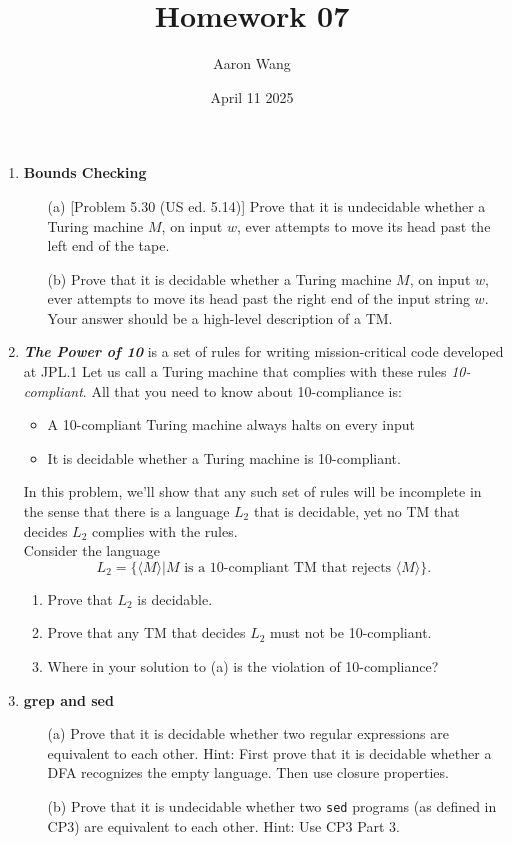 \documentclass{article}
\title{Homework 07}
\author{Aaron Wang}
\date{April 11 2025}
\newcommand{\str}{\texttt}
\newcommand{\newp}{\\[2mm]}
\begin{document}
\maketitle
\begin{enumerate}
    \item \textbf{Bounds Checking}
    \begin{enumerate}
        \item [(a)] [Problem 5.30 (US ed. 5.14)] Prove that it is undecidable whether a Turing machine $M$, on input $w$, ever attempts to move its head past the left end of the tape.\newp
        
        \item [(b)]Prove that it is decidable whether a Turing machine $M$, on input $w$, ever attempts to move its head past the right end of the input string $w$. Your answer should be a high-level description of a TM.\newp
        
    \end{enumerate}
\newpage
    \item \textbf{\emph{The Power of 10}} is a set of rules for writing mission-critical code developed
at JPL.1 Let us call a Turing machine that complies with these rules \emph{10-compliant}. All that you need to know about 10-compliance is:
    \begin{itemize}
        \item A 10-compliant Turing machine always halts on every input
        \item It is decidable whether a Turing machine is 10-compliant.
    \end{itemize}
    In this problem, we’ll show that any such set of rules will be incomplete in the sense that there is a language $L_2$ that is decidable, yet no TM that decides $L_2$ complies with the rules.\newp
    Consider the language
    \[
        L_2 = \{\langle M \rangle | M\text{ is a 10-compliant TM that rejects } \langle M \rangle \}.
    \]
    \begin{enumerate}
        \item Prove that $L_2$ is decidable.\newp
        
        \item Prove that any TM that decides $L_2$ must not be 10-compliant.\newp
        
        \item Where in your solution to (a) is the violation of 10-compliance?\newp
        
    \end{enumerate}
\newpage
    \item \textbf{grep and sed}
    \begin{enumerate}
        \item [(a)] Prove that it is decidable whether two regular expressions are equivalent to each other. Hint: First prove that it is decidable whether a DFA recognizes the empty language. Then use closure properties.\newp
        
        \item [(b)] Prove that it is undecidable whether two \str{sed} programs (as defined in CP3) are equivalent to each other. Hint: Use CP3 Part 3.\newp
        
    \end{enumerate}
\end{enumerate}
\end{document}

